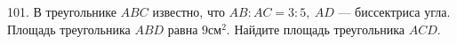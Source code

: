 101. В треугольнике $ABC$ известно, что $AB:AC=3:5,\ AD$ --- биссектриса угла. Площадь треугольника $ABD$ равна $9\text{см}^2.$ Найдите площадь треугольника $ACD.$\\
